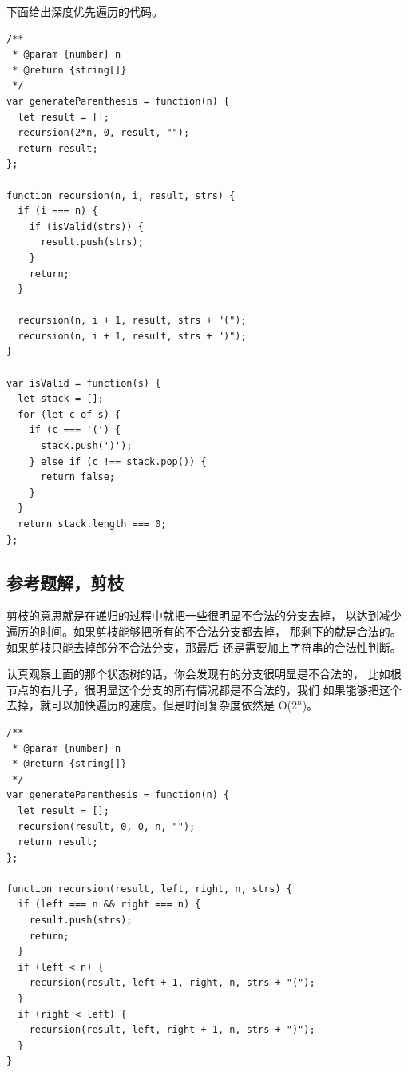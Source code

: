下面给出深度优先遍历的代码。

\begin{verbatim}
/**
 * @param {number} n
 * @return {string[]}
 */
var generateParenthesis = function(n) {
  let result = [];
  recursion(2*n, 0, result, "");
  return result;
};

function recursion(n, i, result, strs) {
  if (i === n) {
    if (isValid(strs)) {
      result.push(strs);
    }
    return;
  }

  recursion(n, i + 1, result, strs + "(");
  recursion(n, i + 1, result, strs + ")");
}

var isValid = function(s) {
  let stack = [];
  for (let c of s) {
    if (c === '(') {
      stack.push(')');
    } else if (c !== stack.pop()) {
      return false;
    }
  }
  return stack.length === 0;
};
\end{verbatim}

\subsection{参考题解，剪枝}

剪枝的意思就是在递归的过程中就把一些很明显不合法的分支去掉，
以达到减少遍历的时间。如果剪枝能够把所有的不合法分支都去掉，
那剩下的就是合法的。如果剪枝只能去掉部分不合法分支，那最后
还是需要加上字符串的合法性判断。

认真观察上面的那个状态树的话，你会发现有的分支很明显是不合法的，
比如根节点的右儿子，很明显这个分支的所有情况都是不合法的，我们
如果能够把这个去掉，就可以加快遍历的速度。但是时间复杂度依然是 O(2$^{n}$)。

\begin{verbatim}
/**
 * @param {number} n
 * @return {string[]}
 */
var generateParenthesis = function(n) {
  let result = [];
  recursion(result, 0, 0, n, "");
  return result;
};

function recursion(result, left, right, n, strs) {
  if (left === n && right === n) {
    result.push(strs);
    return;
  }
  if (left < n) {
    recursion(result, left + 1, right, n, strs + "(");
  }
  if (right < left) {
    recursion(result, left, right + 1, n, strs + ")");
  }
}
\end{verbatim}
